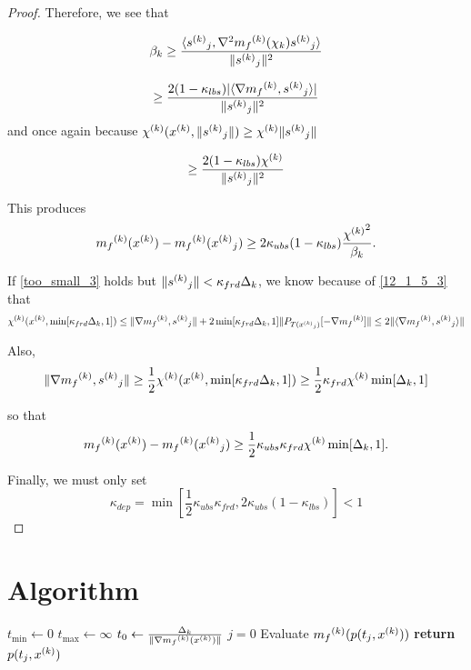 \documentclass{article}
\begin{document}
\begin{proof}
Therefore, we see that

\[
\beta_k \ge \frac {\langle {{s}^{(k)}}_{j},\nabla^2{{m}_f}^{(k)}(\chi_k){{s}^{(k)}}_{j}\rangle}{\|{{s}^{(k)}}_{j}\|^2}
\]

\[ \ge \frac {2(1-\kappa_{lbs})|\langle\nabla{{m}_f}^{(k)},{{s}^{(k)}}_{j}\rangle|}{\|{{s}^{(k)}}_{j}\|^2} \]
and once again because ${\chi^{(k)}}({x}^{(k)}, \|{{s}^{(k)}}_{j}\|) \ge {\chi^{(k)}} \|{{s}^{(k)}}_{j}\|$

\[
\ge \frac {2(1-\kappa_{lbs}){\chi^{(k)}}}{\|{{s}^{(k)}}_{j}\|^2}
\]

This produces
\[
{{m}_f}^{(k)}({x}^{(k)})-{{m}_f}^{(k)}({{x}^{(k)}}_{j}) \ge 2 \kappa_{ubs}(1-\kappa_{lbs})\frac{{\chi^{(k)}}^2}{\beta_k}.
\]

If \ref{too_small_3} holds but $\|{{s}^{(k)}}_{j}\|<\kappa_{frd}\Delta_k$, we know because of \ref{12_1_5_3} that
\[
{\chi^{(k)}}({x}^{(k)}, \min[\kappa_{frd}\Delta_k, 1]) \le \|\nabla{{m}_f}^{(k)}, {{s}^{(k)}}_{j}\| + 2 \min[\kappa_{frd}\Delta_k, 1]\|P_{T({{x}^{(k)}}_{j})}[-\nabla{{m}_f}^{(k)}]\|\le 2 \|\langle\nabla{{m}_f}^{(k)}, {{s}^{(k)}}_{j}\rangle\|
\]

Also,
\begin{align}
\|\nabla{{m}_f}^{(k)}, {{s}^{(k)}}_{j}\| \ge \frac 1 2 {\chi^{(k)}}({x}^{(k)}, \min[\kappa_{frd}\Delta_k,1]) \ge \frac 1 2 \kappa_{frd}{\chi^{(k)}} \min[\Delta_k, 1]
\end{align}

so that
\begin{align}
{{m}_f}^{(k)}({x}^{(k)})-{{m}_f}^{(k)}({{x}^{(k)}}_{j}) \ge \frac 1 2 \kappa_{ubs}\kappa_{frd}{\chi^{(k)}} \min[\Delta_k, 1].
\end{align}

Finally, we must only set
\[
\kappa_{dep} = \min[\frac 1 2 \kappa_{ubs}\kappa_{frd}, 2\kappa_{ubs}(1-\kappa_{lbs})] < 1
\]



\end{proof}





\section{Algorithm}

\begin{algorithmic}
\State $t_{\text{min}} \gets 0$
\State $t_{\text{max}} \gets \infty$
\State $t_{0} \gets \frac{\Delta_k}{\|\nabla {{m}_f}^{(k)}({x}^{(k)})\|}$
\State $j=0$
    \State Evaluate ${{m}_f}^{(k)}(p(t_j, {x}^{(k)}))$
    \Else
        \State \textbf{return}  $p(t_j, {x}^{(k)})$
    \EndIf
    \Else
    \EndIf
\EndWhile
\end{algorithmic}
\end{document}
